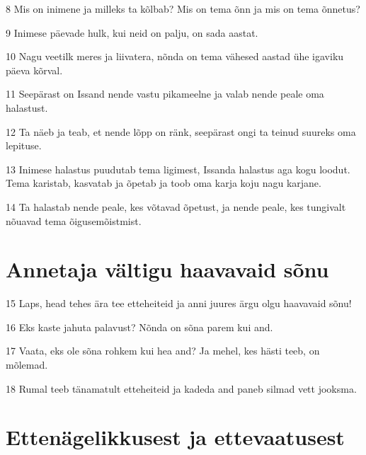 \par 8 Mis on inimene ja milleks ta kõlbab? Mis on tema õnn ja mis on tema õnnetus?
\par 9 Inimese päevade hulk, kui neid on palju, on sada aastat.
\par 10 Nagu veetilk meres ja liivatera, nõnda on tema vähesed aastad ühe igaviku päeva kõrval.
\par 11 Seepärast on Issand nende vastu pikameelne ja valab nende peale oma halastust.
\par 12 Ta näeb ja teab, et nende lõpp on ränk, seepärast ongi ta teinud suureks oma lepituse.
\par 13 Inimese halastus puudutab tema ligimest, Issanda halastus aga kogu loodut. Tema karistab, kasvatab ja õpetab ja toob oma karja koju nagu karjane.
\par 14 Ta halastab nende peale, kes võtavad õpetust, ja nende peale, kes tungivalt nõuavad tema õigusemõistmist.

\section*{Annetaja vältigu haavavaid sõnu}

\par 15 Laps, head tehes ära tee etteheiteid ja anni juures ärgu olgu haavavaid sõnu!
\par 16 Eks kaste jahuta palavust? Nõnda on sõna parem kui and.
\par 17 Vaata, eks ole sõna rohkem kui hea and? Ja mehel, kes hästi teeb, on mõlemad.
\par 18 Rumal teeb tänamatult etteheiteid ja kadeda and paneb silmad vett jooksma.

\section*{Ettenägelikkusest ja ettevaatusest}

